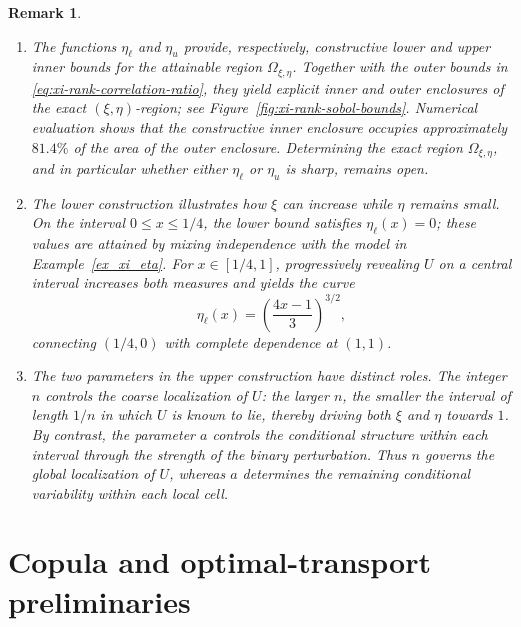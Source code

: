 \documentclass{article}
\newtheorem{remark}[theorem]{Remark}
\begin{document}
\begin{remark}
\begin{enumerate}[label = (\alph*)]
\item The functions \(\eta_\ell\) and \(\eta_u\) provide, respectively, constructive lower and upper inner bounds for the attainable region \(\Omega_{\xi,\eta}\).
Together with the outer bounds in \eqref{eq:xi-rank-correlation-ratio}, they yield explicit inner and outer enclosures of the exact \((\xi,\eta)\)-region; see Figure~\ref{fig:xi-rank-sobol-bounds}.
Numerical evaluation shows that the constructive inner enclosure occupies approximately \(81.4\%\) of the area of the outer enclosure.
Determining the exact region \(\Omega_{\xi,\eta}\), and in particular whether either \(\eta_\ell\) or \(\eta_u\) is sharp, remains open.
\item The lower construction illustrates how \(\xi\) can increase while \(\eta\) remains small.
On the interval \(0\leq x\leq1/4\), the lower bound satisfies \(\eta_\ell(x)=0\); these values are attained by mixing independence with the model in Example~\ref{ex_xi_eta}.
For \(x\in[1/4,1]\), progressively revealing \(U\) on a central interval increases both measures and yields the curve
    \[
        \eta_\ell(x)
        =
        \left(\frac{4x-1}{3}\right)^{3/2},
    \]
    connecting \((1/4,0)\) with complete dependence at \((1,1)\).
    \item The two parameters in the upper construction have distinct roles.
    The integer \(n\) controls the coarse localization of \(U\): the larger \(n\), the smaller the interval of length \(1/n\) in which \(U\) is known to lie, thereby driving both \(\xi\) and \(\eta\) towards \(1\).
    By contrast, the parameter \(a\) controls the conditional structure within each interval through the strength of the binary perturbation.
    Thus \(n\) governs the global localization of \(U\), whereas \(a\) determines the remaining conditional variability within each local cell.
\end{enumerate}
\end{remark}




\section{Copula and optimal-transport preliminaries}\label{sec:prelim}
\end{document}
